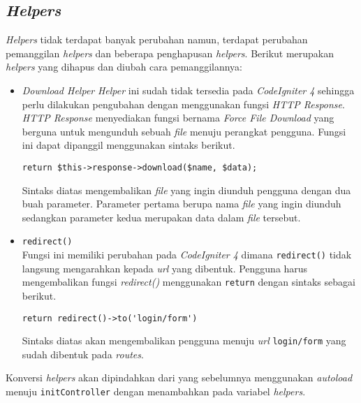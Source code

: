 \subsection{\textit{Helpers}}
\textit{Helpers} tidak terdapat banyak perubahan namun, terdapat perubahan pemanggilan \textit{helpers} dan beberapa penghapusan \textit{helpers}. Berikut merupakan \textit{helpers} yang dihapus dan diubah cara pemanggilannya:
\begin{itemize}
\item \textit{Download Helper}
\textit{Helper} ini sudah tidak tersedia pada \textit{CodeIgniter 4} sehingga perlu dilakukan pengubahan dengan menggunakan fungsi \textit{HTTP Response}. \textit{HTTP Response} menyediakan fungsi bernama \textit{Force File Download} yang berguna untuk mengunduh sebuah \textit{file} menuju perangkat pengguna. Fungsi ini dapat dipanggil menggunakan sintaks berikut.

\begin{center}
 \verb|return $this->response->download($name, $data);|
\end{center}

Sintaks diatas mengembalikan \textit{file} yang ingin diunduh pengguna dengan dua buah parameter. Parameter pertama berupa nama \textit{file} yang ingin diunduh sedangkan parameter kedua merupakan data dalam \textit{file} tersebut.

\item \texttt{redirect()} \\
Fungsi ini memiliki perubahan pada \textit{CodeIgniter 4} dimana \texttt{redirect()} tidak langsung mengarahkan kepada \textit{url} yang dibentuk. Pengguna harus mengembalikan fungsi \textit{redirect()} menggunakan \texttt{return} dengan sintaks sebagai berikut.
\begin{center}
 \verb|return redirect()->to('login/form')|
\end{center} 

Sintaks diatas akan mengembalikan pengguna menuju \textit{url} \texttt{login/form} yang sudah dibentuk pada \textit{routes}.

\end{itemize}

Konversi \textit{helpers} akan dipindahkan dari yang sebelumnya menggunakan \textit{autoload} menuju \texttt{initController} dengan menambahkan pada variabel \textit{helpers}.
